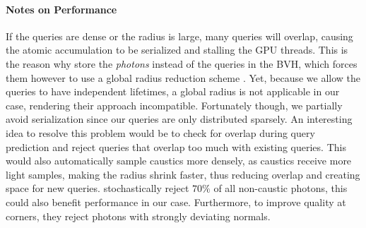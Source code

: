 \paragraph{Notes on Performance}
If the queries are dense or the radius is large, many queries will overlap, causing the atomic accumulation to be serialized and stalling the GPU threads.
This is the reason why \textcite{kern2023} store the \emph{photons} instead of the queries in the BVH, which forces them however to use a global radius reduction scheme .
Yet, because we allow the queries to have independent lifetimes, a global radius is not applicable in our case, rendering their approach incompatible.
Fortunately though, we partially avoid serialization since our queries are only distributed sparsely.
An interesting idea to resolve this problem would be to check for overlap during query prediction and reject queries that overlap too much with existing queries.
This would also automatically sample caustics more densely, as caustics receive more light samples, making the radius shrink faster, thus reducing overlap and creating space for new queries.
\textcite{kern2023} stochastically reject $70\%$ of all non-caustic photons, this could also benefit performance in our case.
Furthermore, to improve quality at corners, they reject photons with strongly deviating normals.


